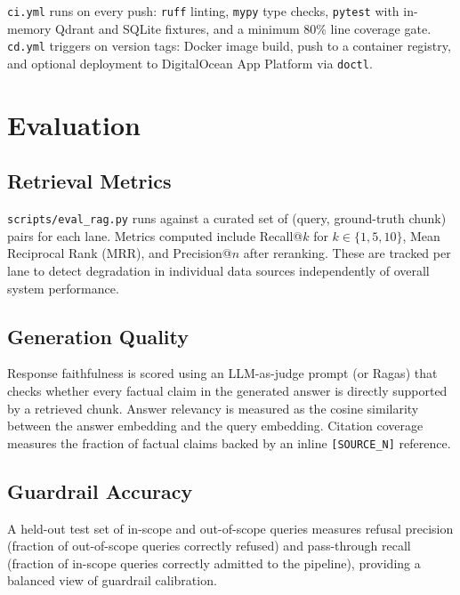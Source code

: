 \documentclass[10pt,a4paper,twocolumn]{article}
\begin{document}
\texttt{ci.yml} runs on every push: \texttt{ruff} linting, \texttt{mypy} type checks,
\texttt{pytest} with in-memory Qdrant and SQLite fixtures, and a minimum 80\% line coverage
gate. \texttt{cd.yml} triggers on version tags: Docker image build, push to a container
registry, and optional deployment to DigitalOcean App Platform via \texttt{doctl}.

\section{Evaluation}

\subsection{Retrieval Metrics}

\texttt{scripts/eval\_rag.py} runs against a curated set of (query, ground-truth chunk)
pairs for each lane. Metrics computed include Recall@$k$ for $k \in \{1, 5, 10\}$,
Mean Reciprocal Rank (MRR), and Precision@$n$ after reranking. These are tracked per lane
to detect degradation in individual data sources independently of overall system performance.

\subsection{Generation Quality}

Response faithfulness is scored using an LLM-as-judge prompt (or Ragas) that checks
whether every factual claim in the generated answer is directly supported by a retrieved
chunk. Answer relevancy is measured as the cosine similarity between the answer embedding
and the query embedding. Citation coverage measures the fraction of factual claims backed
by an inline \texttt{[SOURCE\_N]} reference.

\subsection{Guardrail Accuracy}

A held-out test set of in-scope and out-of-scope queries measures refusal precision
(fraction of out-of-scope queries correctly refused) and pass-through recall (fraction of
in-scope queries correctly admitted to the pipeline), providing a balanced view of guardrail
calibration.
\end{document}
